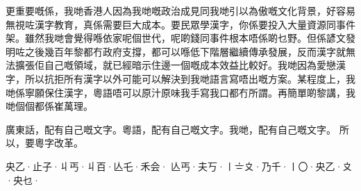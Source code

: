 更重要嘅係，我哋香港人因為我哋嘅政治成見同我哋引以為傲嘅文化背景，好容易無視咗漢字教育，真係需要巨大成本。要民眾學漢字，你係要投入大量資源同事件架。雖然我哋會覺得喺依家呢個世代，呢啲錢同事件根本唔係啲乜野。但係諺文發明咗之後幾百年黎都冇政府支撐，都可以喺低下階層繼續傳承發展，反而漢字就無法擴張佢自己嘅領域，就已經暗示住邊一個嘅成本效益比較好。我哋因為愛戀漢字，所以抗拒所有漢字以外可能可以解決到我哋語言寫唔出嘅方案。某程度上，我哋係寧願保住漢字，粵語唔可以原汁原味我手寫我口都冇所謂。再簡單啲黎講，我哋個個都係崔萬理。

廣東話，配有自己嘅文字。粵語，配有自己嘅文字。我哋，配有自己嘅文字。
所以，要粵字改革。

央乙·止子·丩丐·丩百·亾乇·禾会·
亾丐·夫丂·〡〧〩·乃千·〡〇·央乙·〩·央乜·


